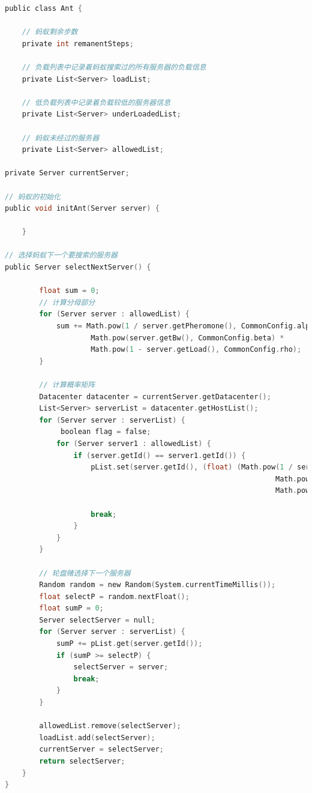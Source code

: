 \begin{lstlisting}[language=C,caption={蚂蚁实体},label=Code:java]
public class Ant {

    // 蚂蚁剩余步数
    private int remanentSteps;

    // 负载列表中记录着蚂蚁搜索过的所有服务器的负载信息
    private List<Server> loadList;

    // 低负载列表中记录着负载较低的服务器信息
    private List<Server> underLoadedList;

    // 蚂蚁未经过的服务器
    private List<Server> allowedList;

private Server currentServer;

// 蚂蚁的初始化
public void initAnt(Server server) {
        
    }

// 选择蚂蚁下一个要搜索的服务器
public Server selectNextServer() {

        float sum = 0;
        // 计算分母部分
        for (Server server : allowedList) {
            sum += Math.pow(1 / server.getPheromone(), CommonConfig.alpha) *
                    Math.pow(server.getBw(), CommonConfig.beta) *
                    Math.pow(1 - server.getLoad(), CommonConfig.rho);
        }

        // 计算概率矩阵
        Datacenter datacenter = currentServer.getDatacenter();
        List<Server> serverList = datacenter.getHostList();
        for (Server server : serverList) {
             boolean flag = false;
            for (Server server1 : allowedList) {
                if (server.getId() == server1.getId()) {
                    pList.set(server.getId(), (float) (Math.pow(1 / server.getPheromone(), CommonConfig.alpha) *
                                                               Math.pow(server.getBw(), CommonConfig.beta) *
                                                               Math.pow(1 - server.getLoad(), CommonConfig.rho) / sum));

                    break;
                }
            }
        }

        // 轮盘赌选择下一个服务器
        Random random = new Random(System.currentTimeMillis());
        float selectP = random.nextFloat();
        float sumP = 0;
        Server selectServer = null;
        for (Server server : serverList) {
            sumP += pList.get(server.getId());
            if (sumP >= selectP) {
                selectServer = server;
                break;
            }
        }

        allowedList.remove(selectServer);
        loadList.add(selectServer);
        currentServer = selectServer;
        return selectServer;
    }
}
\end{lstlisting}

